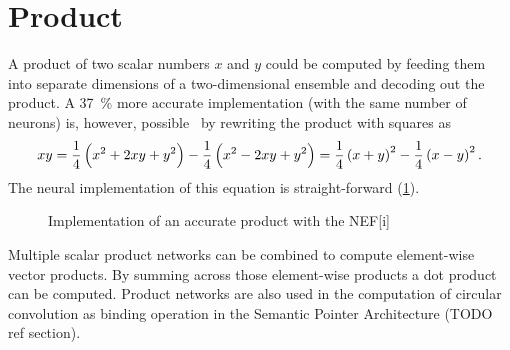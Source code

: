 \section{Product}\label{sec:product}
A product of two scalar numbers $x$ and $y$ could be computed by feeding them into separate dimensions of a two-dimensional ensemble and decoding out the product.
A \SI{37}{\percent} more accurate implementation (with the same number of neurons) is, however, possible~\parencite{gosmann2015-1} by rewriting the product with squares as
\begin{equation}
    xy = \frac{1}{4}\del{x^2 + 2xy + y^2} - \frac{1}{4}\del{x^2 - 2xy + y^2} = \frac{1}{4}\del{x + y}^2 - \frac{1}{4}\del{x - y}^2 \text{.}
\end{equation}
The neural implementation of this equation is straight-forward (\cref{fig:product-net}).
\begin{figure}
    \begin{captionbeside}{Implementation of an accurate product with the NEF}[i]
    \end{captionbeside}\label{fig:product-net}
\end{figure}

Multiple scalar product networks can be combined to compute element-wise vector products.
By summing across those element-wise products a dot product can be computed.
Product networks are also used in the computation of circular convolution as binding operation in the Semantic Pointer Architecture (TODO ref section).

